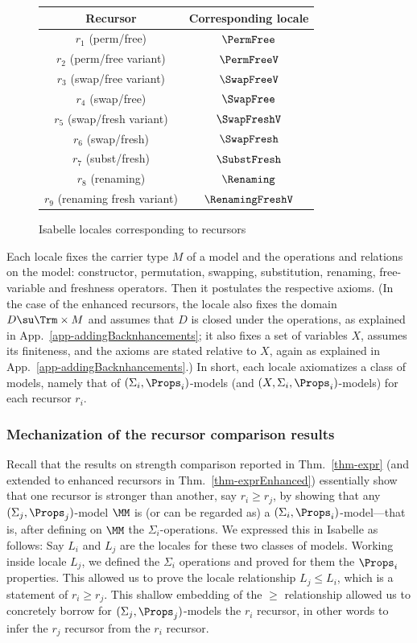\begin{figure}
	\centering
	\begin{tabular}{c|c}
		Recursor & Corresponding locale
		\\\hline 
		$r_1$ (perm/free) & $\PermFree$
		\\
		$r_2$ (perm/free variant) &  $\PermFreeV$
		\\
		$r_3$ (swap/free variant) & $\SwapFreeV$
		\\
		$r_4$ (swap/free) & $\SwapFree$
		\\
		$r_5$ (swap/fresh variant) & $\SwapFreshV$
		\\
		$r_6$ (swap/fresh) &  $\SwapFresh$
		\\
		$r_7$ (subst/fresh) & $\SubstFresh$
		\\
		$r_8$ (renaming) & $\Renaming$
		\\
		$r_9$ (renaming fresh variant) &  $\RenamingFreshV$
		\\
	\end{tabular}
	\caption{Isabelle locales corresponding to recursors}
	\label{fig-localesRec}
\end{figure}


Each locale fixes the carrier type $M$ of a model and the operations and relations on the model: constructor, permutation, swapping, substitution, renaming, free-variable and freshness operators. 
Then it postulates the respective axioms. (In the case of the enhanced recursors, the locale also fixes the domain $D \su \Trm \times M$ and assumes that $D$ is closed under the operations, as explained in App.~\ref{app-addingBacknhancements}; it also fixes a set of variables $X$, assumes its finiteness, and the axioms are stated relative to $X$, again as explained in App.~\ref{app-addingBacknhancements}.) In short, each locale axiomatizes a class of models, namely that of $(\Sigma_i,\Props_i)$-models (and $(X,\Sigma_i,\Props_i)$-models) for each recursor $r_i$.  

\subsubsection{Mechanization of the recursor comparison results}

Recall that the results on strength comparison reported in Thm.~\ref{thm-expr} (and extended to enhanced recursors in Thm.~\ref{thm-exprEnhanced}) essentially show that 
one recursor is stronger than another, say $r_i \geq r_j$, by showing that any $(\Sigma_j,\Props_j)$-model $\MM$ is (or can be regarded as) a $(\Sigma_i,\Props_i)$-model---that is, after defining on $\MM$ the $\Sigma_i$-operations. We expressed this in Isabelle as follows: Say $L_i$ and $L_j$ are the locales for these two classes of models. Working inside locale $L_j$, we defined the $\Sigma_i$ operations and proved for them the $\Props_i$ properties. This allowed us  to prove the locale relationship $L_j \leq L_i$, which is a statement of $r_i \geq r_j$. This shallow embedding of the $\geq$ relationship allowed us to concretely borrow for $(\Sigma_j,\Props_j)$-models the $r_i$ recursor, in other words to infer the $r_j$ recursor from the $r_i$ recursor. 

